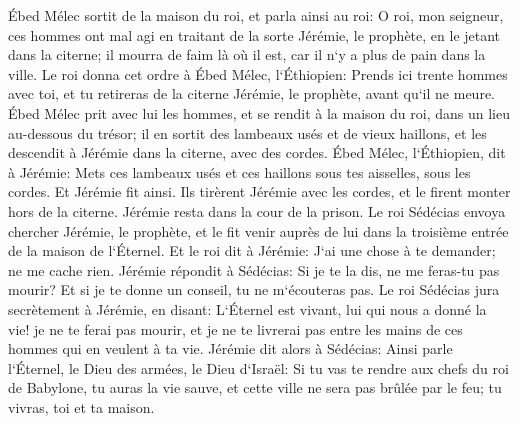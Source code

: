 \verse Ébed Mélec sortit de la maison du roi, et parla ainsi au roi: 
\verse O roi, mon seigneur, ces hommes ont mal agi en traitant de la sorte Jérémie, le prophète, en le jetant dans la citerne; il mourra de faim là où il est, car il n`y a plus de pain dans la ville. 
\verse Le roi donna cet ordre à Ébed Mélec, l`Éthiopien: Prends ici trente hommes avec toi, et tu retireras de la citerne Jérémie, le prophète, avant qu`il ne meure. 
\verse Ébed Mélec prit avec lui les hommes, et se rendit à la maison du roi, dans un lieu au-dessous du trésor; il en sortit des lambeaux usés et de vieux haillons, et les descendit à Jérémie dans la citerne, avec des cordes. 
\verse Ébed Mélec, l`Éthiopien, dit à Jérémie: Mets ces lambeaux usés et ces haillons sous tes aisselles, sous les cordes. Et Jérémie fit ainsi. 
\verse Ils tirèrent Jérémie avec les cordes, et le firent monter hors de la citerne. Jérémie resta dans la cour de la prison. 
\verse Le roi Sédécias envoya chercher Jérémie, le prophète, et le fit venir auprès de lui dans la troisième entrée de la maison de l`Éternel. Et le roi dit à Jérémie: J`ai une chose à te demander; ne me cache rien. 
\verse Jérémie répondit à Sédécias: Si je te la dis, ne me feras-tu pas mourir? Et si je te donne un conseil, tu ne m`écouteras pas. 
\verse Le roi Sédécias jura secrètement à Jérémie, en disant: L`Éternel est vivant, lui qui nous a donné la vie! je ne te ferai pas mourir, et je ne te livrerai pas entre les mains de ces hommes qui en veulent à ta vie. 
\verse Jérémie dit alors à Sédécias: Ainsi parle l`Éternel, le Dieu des armées, le Dieu d`Israël: Si tu vas te rendre aux chefs du roi de Babylone, tu auras la vie sauve, et cette ville ne sera pas brûlée par le feu; tu vivras, toi et ta maison. 
